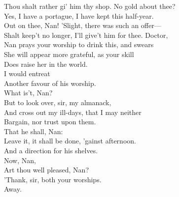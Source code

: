 \documentclass[a4paper,oneside,12pt]{memoir}
\begin{document}
\begin{drama*}
Thou shalt rather gi' him thy shop. No gold about thee?\\
\druggerspeaks Yes, I have a portague, I have kept this half-year.\\
\facespeaks Out on thee, Nan! 'Slight, there was such an offer---\\
Shalt keep't no longer, I'll give't him for thee. Doctor,\\
Nan prays your worship to drink this, and swears\\
She will appear more grateful, as your skill\\
Does raise her in the world.\\
\druggerspeaks {} I would entreat\\
Another favour of his worship.\\
\facespeaks What is't, Nan?\\
\druggerspeaks {} But to look over, sir, my almanack,\\
And cross out my ill-days, that I may neither\\
Bargain, nor trust upon them.\\
\facespeaks {} That he shall, Nan:\\
Leave it, it shall be done, 'gainst afternoon.\\
\subtlespeaks And a direction for his shelves.\\
\facespeaks {} Now, Nan,\\
Art thou well pleased, Nan?\\
\druggerspeaks {} 'Thank, sir, both your worships.\\
\facespeaks {} Away.\\

\scene


\end{drama*}
\end{document}

